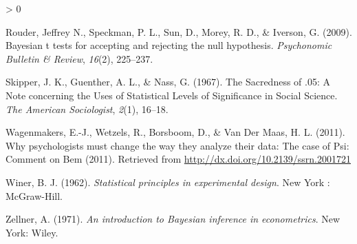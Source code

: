 \documentclass[
  english,
  ,man,floatsintext]{apa6}
\newlength{\cslhangindent}
\newenvironment{CSLReferences}[2] %
 {%
  \setlength{\parindent}{0pt}
  \ifodd #1 \everypar{\setlength{\hangindent}{\cslhangindent}}\ignorespaces\fi
  \ifnum #2 > 0
  \setlength{\parskip}{#2\baselineskip}
  \fi
 }%
 {}
\begin{document}
\begin{CSLReferences}{1}{0}
\leavevmode\hypertarget{ref-rouder2009bayesian}{}%
Rouder, Jeffrey N., Speckman, P. L., Sun, D., Morey, R. D., \& Iverson, G. (2009). Bayesian t tests for accepting and rejecting the null hypothesis. \emph{Psychonomic Bulletin \& Review}, \emph{16}(2), 225--237.

\leavevmode\hypertarget{ref-skipper_sacredness_1967}{}%
Skipper, J. K., Guenther, A. L., \& Nass, G. (1967). The {Sacredness} of .05: {A Note} concerning the {Uses} of {Statistical Levels} of {Significance} in {Social Science}. \emph{The American Sociologist}, \emph{2}(1), 16--18.

\leavevmode\hypertarget{ref-wagenmakers2011psychologists}{}%
Wagenmakers, E.-J., Wetzels, R., Borsboom, D., \& Van Der Maas, H. L. (2011). Why psychologists must change the way they analyze their data: The case of {P}si: {C}omment on {B}em (2011). Retrieved from \url{http://dx.doi.org/10.2139/ssrn.2001721}

\leavevmode\hypertarget{ref-winer_statistical_1962}{}%
Winer, B. J. (1962). \emph{Statistical principles in experimental design}. {New York : McGraw-Hill}.

\leavevmode\hypertarget{ref-zellner_introduction_1971}{}%
Zellner, A. (1971). \emph{An introduction to {Bayesian} inference in econometrics}. {New York}: {Wiley}.

\end{CSLReferences}
\end{document}
